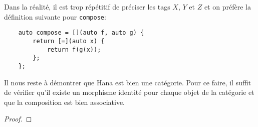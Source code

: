 Dans la réalité, il est trop répétitif de préciser les tags $X$, $Y$ et $Z$
et on préfère la définition suivante pour {\tt compose}:
\begin{verbatim}
    auto compose = [](auto f, auto g) {
        return [=](auto x) {
            return f(g(x));
        };
    };
\end{verbatim}

Il nous reste à démontrer que Hana est bien une catégorie. Pour ce faire, il
suffit de vérifier qu'il existe un morphisme identité pour chaque objet de
la catégorie et que la composition est bien associative.

\begin{proof}

\end{proof}
